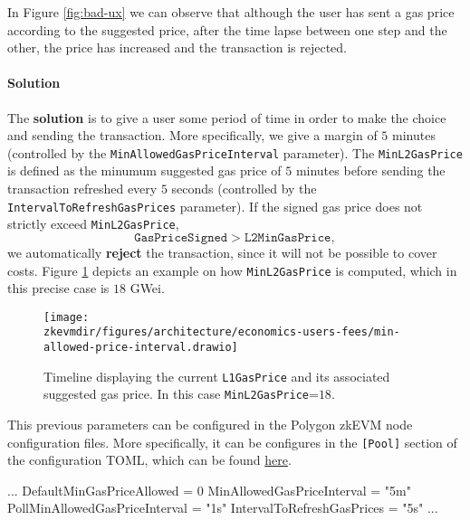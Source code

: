 In Figure \ref{fig:bad-ux} we can observe that although the user has sent a gas price according to the suggested price, after the time lapse between one step and the other, the price has increased and the transaction is rejected.

\paragraph*{Solution}

The \textbf{solution} is to give a user some period of time in order to make the choice and sending the transaction. More specifically, we give a margin of $5$ minutes (controlled by the \texttt{MinAllowedGasPriceInterval} parameter). The \texttt{MinL2GasPrice} is defined as the minumum suggested gas price of $5$ minutes before sending the transaction refreshed every $5$ seconds (controlled by the \texttt{IntervalToRefreshGasPrices} parameter). If the signed gas price does not strictly exceed \texttt{MinL2GasPrice},
\[
\texttt{GasPriceSigned} > \texttt{L2MinGasPrice},
\]
we automatically \textbf{reject} the transaction, since it will not be possible to cover costs. Figure \ref{fig:minimum-gas-price} depicts an example on how \texttt{MinL2GasPrice} is computed, which in this precise case is $18$ GWei.

\begin{figure}[H]
\centering
\texttt{[image: \\zkevmdir/figures/architecture/economics-users-fees/min-allowed-price-interval.drawio]}
\caption{Timeline displaying the current \texttt{L1GasPrice} and its associated suggested gas price. In this case \texttt{MinL2GasPrice}=$18$. }
\label{fig:minimum-gas-price}
\end{figure}

This previous parameters can be configured in the Polygon zkEVM node configuration files. More specifically, it can be configures in the \texttt{[Pool]} section of the configuration TOML, which can be found \href{https://github.com/0xPolygonHermez/zkevm-node/blob/b938572f138ba6cc40ef6736153c469afeb11c96/config/default.go#L37}{here}.

\vspace{1em}

\begin{toml}
[Pool]
...
DefaultMinGasPriceAllowed = 0
MinAllowedGasPriceInterval = "5m"
PollMinAllowedGasPriceInterval = "1s"
IntervalToRefreshGasPrices = "5s"
...
\end{toml}

